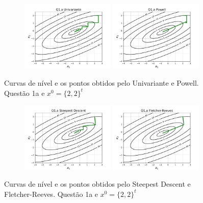 \documentclass[10pt, a4paper]{article}
\begin{document}
\begin{figure}[H]
  \centering
  \begin{subfigure}[b]{\textwidth}
    \includegraphics[width=0.49\textwidth]{figuras/Q1.a_Univariante_P0=[2 2].pdf}
    \includegraphics[width=0.49\textwidth]{figuras/Q1.a_Powell_P0=[2 2].pdf}
  \end{subfigure}
  \caption{Curvas de nível e os pontos obtidos pelo Univariante e Powell. Questão 1a e $x^0 = \{2,2\}^t$}
\end{figure}

\begin{figure}[H]
  \centering
  \begin{subfigure}[b]{\textwidth}
    \includegraphics[width=0.49\textwidth]{figuras/Q1.a_Steepest Descent_P0=[2 2].pdf}
    \includegraphics[width=0.49\textwidth]{figuras/Q1.a_Fletcher-Reeves_P0=[2 2].pdf}
  \end{subfigure}
  \caption{Curvas de nível e os pontos obtidos pelo Steepest Descent e Fletcher-Reeves. Questão 1a e $x^0 = \{2,2\}^t$}
\end{figure}
\end{document}
